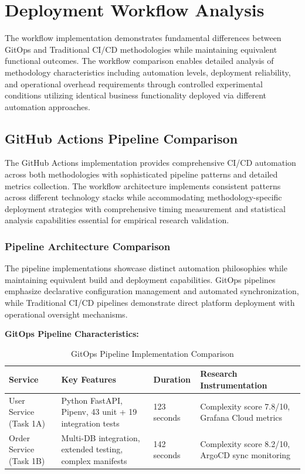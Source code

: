 \section{Deployment Workflow Analysis}

The workflow implementation demonstrates fundamental differences between GitOps and Traditional CI/CD methodologies while maintaining equivalent functional outcomes. The workflow comparison enables detailed analysis of methodology characteristics including automation levels, deployment reliability, and operational overhead requirements through controlled experimental conditions utilizing identical business functionality deployed via different automation approaches.

\subsection{GitHub Actions Pipeline Comparison}

The GitHub Actions implementation provides comprehensive CI/CD automation across both methodologies with sophisticated pipeline patterns and detailed metrics collection. The workflow architecture implements consistent patterns across different technology stacks while accommodating methodology-specific deployment strategies with comprehensive timing measurement and statistical analysis capabilities essential for empirical research validation.


\subsubsection{Pipeline Architecture Comparison}

The pipeline implementations showcase distinct automation philosophies while maintaining equivalent build and deployment capabilities. GitOps pipelines emphasize declarative configuration management and automated synchronization, while Traditional CI/CD pipelines demonstrate direct platform deployment with operational oversight mechanisms.

\textbf{GitOps Pipeline Characteristics:}

\begin{table}[H]
\centering
\caption{GitOps Pipeline Implementation Comparison}
\label{tab:gitops-pipeline-comparison}
\begin{tabular}{|p{3cm}|p{4cm}|p{3cm}|p{4cm}|}
\hline
\textbf{Service} & \textbf{Key Features} & \textbf{Duration} & \textbf{Research Instrumentation} \\
\hline
User Service (Task 1A) & Python FastAPI, Pipenv, 43 unit + 19 integration tests & 123 seconds & Complexity score 7.8/10, Grafana Cloud metrics \\
\hline
Order Service (Task 1B) & Multi-DB integration, extended testing, complex manifests & 142 seconds & Complexity score 8.2/10, ArgoCD sync monitoring \\
\hline
\end{tabular}
\end{table}

